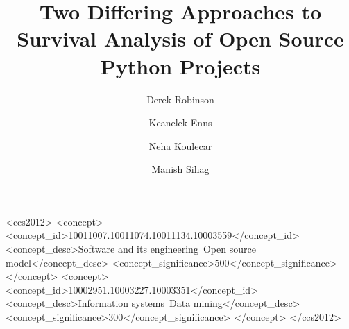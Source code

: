 \documentclass[acmconf]{acmart}
\begin{document}
\graphicspath{ {./img/} }



\title[Survival Analysis of Open Source Projects]{Two Differing Approaches to Survival Analysis of Open Source Python Projects}

\author{Derek Robinson}
\author{Keanelek Enns}
\author{Neha Koulecar}
\author{Manish Sihag}

\renewcommand{\shortauthors}{D. Robinson, K. Enns, N. Koulecar, M. Sihag}

\begin{abstract}
\end{abstract}

\begin{CCSXML}
<ccs2012>
<concept>
<concept_id>10011007.10011074.10011134.10003559</concept_id>
<concept_desc>Software and its engineering~Open source model</concept_desc>
<concept_significance>500</concept_significance>
</concept>
<concept>
<concept_id>10002951.10003227.10003351</concept_id>
<concept_desc>Information systems~Data mining</concept_desc>
<concept_significance>300</concept_significance>
</concept>
</ccs2012>
\end{CCSXML}

\end{document}
